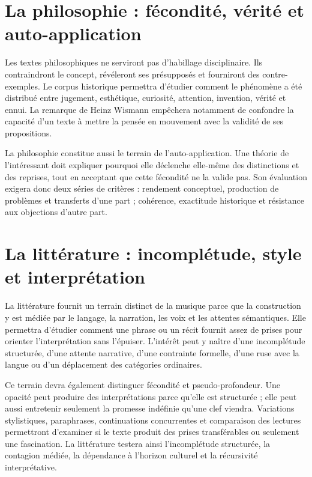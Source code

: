 \documentclass[11pt,a4paper]{article}
\begin{document}
\section{La philosophie : fécondité, vérité et auto-application}

Les textes philosophiques ne serviront pas d'habillage disciplinaire. Ils
contraindront le concept, révéleront ses présupposés et fourniront des
contre-exemples. Le corpus historique permettra d'étudier comment le phénomène a
été distribué entre jugement, esthétique, curiosité, attention, invention,
vérité et ennui. La remarque de Heinz Wismann empêchera notamment de confondre
la capacité d'un texte à mettre la pensée en mouvement avec la validité de ses
propositions.

La philosophie constitue aussi le terrain de l'auto-application. Une théorie de
l'intéressant doit expliquer pourquoi elle déclenche elle-même des distinctions
et des reprises, tout en acceptant que cette fécondité ne la valide pas. Son
évaluation exigera donc deux séries de critères : rendement conceptuel,
production de problèmes et transferts d'une part ; cohérence, exactitude
historique et résistance aux objections d'autre part.

\section{La littérature : incomplétude, style et interprétation}

La littérature fournit un terrain distinct de la musique parce que la
construction y est médiée par le langage, la narration, les voix et les attentes
sémantiques. Elle permettra d'étudier comment une phrase ou un récit fournit
assez de prises pour orienter l'interprétation sans l'épuiser. L'intérêt peut y
naître d'une incomplétude structurée, d'une attente narrative, d'une contrainte
formelle, d'une ruse avec la langue ou d'un déplacement des catégories
ordinaires.

Ce terrain devra également distinguer fécondité et pseudo-profondeur. Une
opacité peut produire des interprétations parce qu'elle est structurée ; elle
peut aussi entretenir seulement la promesse indéfinie qu'une clef viendra.
Variations stylistiques, paraphrases, continuations concurrentes et comparaison
des lectures permettront d'examiner si le texte produit des prises
transférables ou seulement une fascination. La littérature testera ainsi
l'incomplétude structurée, la contagion médiée, la dépendance à l'horizon
culturel et la récursivité interprétative.
\end{document}
